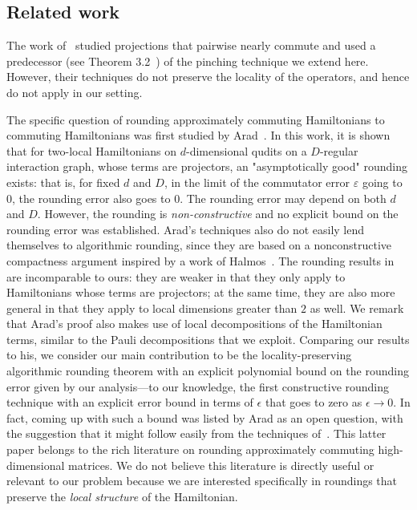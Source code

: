 \documentclass[a4paper,onecolumn,11pt]{quantumarticle}
\theoremstyle{plain}
\newcommand{\eps}{\varepsilon}
\begin{document}
\subsection{Related work}
\label{sec:relatedwork}

The work of~\cite{overlapping} studied projections that pairwise nearly commute and used a predecessor (see Theorem 3.2~\cite{overlapping}) of the pinching technique we extend here. However, their techniques do not preserve the locality of the operators, and hence do not apply in our setting.

The specific question of rounding approximately commuting Hamiltonians to commuting Hamiltonians was first studied by Arad~\cite{arad2011notepartialnogotheorem}. In this work, it is shown that for two-local Hamiltonians on $d$-dimensional qudits on a $D$-regular interaction graph, whose terms are projectors, an "asymptotically good" rounding exists: that is, for fixed $d$ and $D$, in the limit of the commutator error $\eps$ going to $0$, the rounding error also goes to $0$. The rounding error may depend on both $d$ and $D$.  However, the rounding is \emph{non-constructive} and no explicit bound on the rounding error was established. Arad's techniques also do not easily lend themselves to algorithmic rounding, since they are based on a nonconstructive compactness argument inspired by a work of Halmos~\cite{halmos1976some}.
The rounding results in~\cite{arad2011notepartialnogotheorem} are incomparable to ours: they are weaker in that they only apply to Hamiltonians whose terms are projectors; at the same time, they are also more general in that they apply to local dimensions greater than $2$ as well.
We remark that Arad's proof also makes use of local decompositions of the Hamiltonian terms, similar to the Pauli decompositions that we exploit. Comparing our results to his, we consider our main contribution to be the locality-preserving algorithmic rounding theorem with an explicit polynomial bound on the rounding error given by our analysis---to our knowledge, the first constructive rounding technique with an explicit error bound in terms of $\epsilon$ that goes to zero as $\epsilon \rightarrow 0$.
In fact, coming up with such a bound was listed by Arad as an open question, with the suggestion that it might follow easily from the techniques of~\cite{pearcy1979almost}. This latter paper belongs to the rich literature on rounding approximately commuting high-dimensional matrices. We do not believe this literature is directly useful or relevant to our problem because we are interested specifically in roundings that preserve the \emph{local structure} of the Hamiltonian. 
\end{document}
